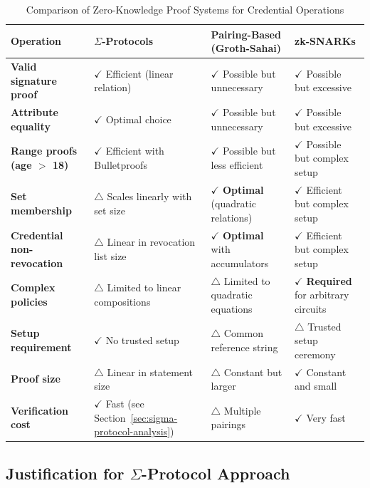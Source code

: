 \begin{table}[ht]
\centering
\caption{Comparison of Zero-Knowledge Proof Systems for Credential Operations}
\label{tab:proof-system-comparison}
\begin{tabular}{p{3.5cm}|p{3.5cm}|p{3.5cm}|p{3.5cm}}
\toprule
\textbf{Operation} & \textbf{$\Sigma$-Protocols} & \textbf{Pairing-Based (Groth-Sahai)} & \textbf{zk-SNARKs} \\
\midrule
\textbf{Valid signature proof} & $\checkmark$ Efficient (linear relation) & $\checkmark$ Possible but unnecessary & $\checkmark$ Possible but excessive \\
\hline
\textbf{Attribute equality} & $\checkmark$ Optimal choice & $\checkmark$ Possible but unnecessary & $\checkmark$ Possible but excessive \\
\hline
\textbf{Range proofs (age $>$ 18)} & $\checkmark$ Efficient with Bulletproofs & $\checkmark$ Possible but less efficient & $\checkmark$ Possible but complex setup \\
\hline
\textbf{Set membership} & $\triangle$ Scales linearly with set size & $\checkmark$ \textbf{Optimal} (quadratic relations) & $\checkmark$ Efficient but complex setup \\
\hline
\textbf{Credential non-revocation} & $\triangle$ Linear in revocation list size & $\checkmark$ \textbf{Optimal} with accumulators & $\checkmark$ Efficient but complex setup \\
\hline
\textbf{Complex policies} & $\triangle$ Limited to linear compositions & $\triangle$ Limited to quadratic equations & $\checkmark$ \textbf{Required} for arbitrary circuits \\
\hline
\textbf{Setup requirement} & $\checkmark$ No trusted setup & $\triangle$ Common reference string & $\triangle$ Trusted setup ceremony \\
\hline
\textbf{Proof size} & $\triangle$ Linear in statement size & $\triangle$ Constant but larger & $\checkmark$ Constant and small \\
\hline
\textbf{Verification cost} & $\checkmark$ Fast (see Section~\ref{sec:sigma-protocol-analysis}) & $\triangle$ Multiple pairings & $\checkmark$ Very fast \\
\bottomrule
\end{tabular}
\end{table}

\subsection{Justification for $\Sigma$-Protocol Approach}

